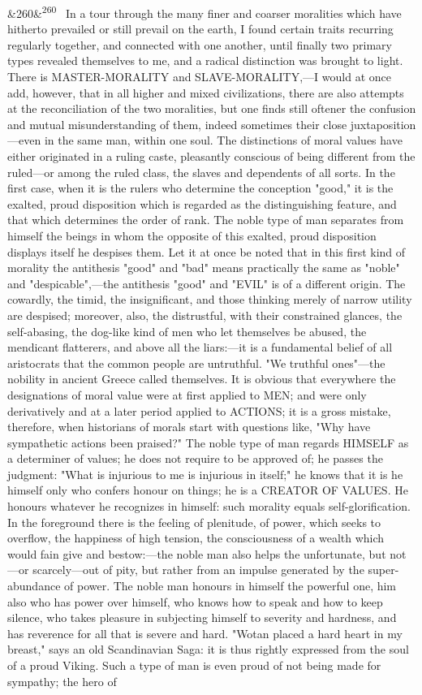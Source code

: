 \documentclass[12pt]{article}
\newcommand{\para}[1][]{\par\noindent\ifx&#1&\else\textsuperscript{\footnotesize #1}~\fi}
\begin{document}
\para[260] In a tour through the many finer and coarser moralities which have hitherto prevailed or still prevail on the earth, I found certain traits recurring regularly together, and connected with one another, until finally two primary types revealed themselves to me, and a radical distinction was brought to light. There is MASTER-MORALITY and SLAVE-MORALITY,---I would at once add, however, that in all higher and mixed civilizations, there are also attempts at the reconciliation of the two moralities, but one finds still oftener the confusion and mutual misunderstanding of them, indeed sometimes their close juxtaposition---even in the same man, within one soul. The distinctions of moral values have either originated in a ruling caste, pleasantly conscious of being different from the ruled---or among the ruled class, the slaves and dependents of all sorts. In the first case, when it is the rulers who determine the conception "good," it is the exalted, proud disposition which is regarded as the distinguishing feature, and that which determines the order of rank. The noble type of man separates from himself the beings in whom the opposite of this exalted, proud disposition displays itself he despises them. Let it at once be noted that in this first kind of morality the antithesis "good" and "bad" means practically the same as "noble" and "despicable",---the antithesis "good" and "EVIL" is of a different origin. The cowardly, the timid, the insignificant, and those thinking merely of narrow utility are despised; moreover, also, the distrustful, with their constrained glances, the self-abasing, the dog-like kind of men who let themselves be abused, the mendicant flatterers, and above all the liars:---it is a fundamental belief of all aristocrats that the common people are untruthful. "We truthful ones"---the nobility in ancient Greece called themselves. It is obvious that everywhere the designations of moral value were at first applied to MEN; and were only derivatively and at a later period applied to ACTIONS; it is a gross mistake, therefore, when historians of morals start with questions like, "Why have sympathetic actions been praised?" The noble type of man regards HIMSELF as a determiner of values; he does not require to be approved of; he passes the judgment: "What is injurious to me is injurious in itself;" he knows that it is he himself only who confers honour on things; he is a CREATOR OF VALUES. He honours whatever he recognizes in himself: such morality equals self-glorification. In the foreground there is the feeling of plenitude, of power, which seeks to overflow, the happiness of high tension, the consciousness of a wealth which would fain give and bestow:---the noble man also helps the unfortunate, but not---or scarcely---out of pity, but rather from an impulse generated by the super-abundance of power. The noble man honours in himself the powerful one, him also who has power over himself, who knows how to speak and how to keep silence, who takes pleasure in subjecting himself to severity and hardness, and has reverence for all that is severe and hard. "Wotan placed a hard heart in my breast," says an old Scandinavian Saga: it is thus rightly expressed from the soul of a proud Viking. Such a type of man is even proud of not being made for sympathy; the hero of 
\end{document}

